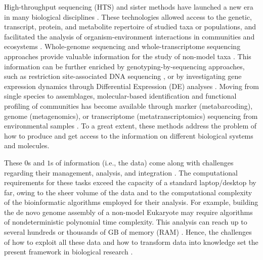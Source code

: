    High-throughput sequencing (HTS) and sister methods have launched a new era in many 
   biological disciplines \citep{mardis2008next, kulski2016next}. 
   These technologies allowed access to the genetic, transcript, protein, and metabolite 
   repertoire \citep{goodwin2016coming} of studied taxa or populations, and facilitated the analysis of 
   organism-environment interactions in communities and ecosystems \citep{bundy2009environmental}. 
   Whole-genome sequencing and whole-transcriptome sequencing approaches provide valuable 
   information for the study of non-model taxa \citep{cahais2012reference}. 
   This information can be further enriched by genotyping-by-sequencing approaches, 
   such as restriction site-associated DNA sequencing \citep{baird2008rapid}, or by investigating gene 
   expression dynamics through Differential Expression (DE) analyses \citep{tarazona2011differential}. 
   Moving from single species to assemblages, molecular-based identification and functional 
   profiling of communities has become available through marker (metabarcoding), 
   genome (metagenomics), or transcriptome (metatranscriptomics) sequencing from environmental 
   samples \citep{goldford2018emergent}. 
   To a great extent, these methods address the problem of how to produce and get access 
   to the information on different biological systems and molecules.

   These $0$s and $1$s of information (i.e., the data) come along with challenges regarding their 
   management, analysis, and integration \citep{merelli2014managing}. 
   The computational requirements for these tasks exceed the capacity of a standard laptop/desktop by far, 
   owing to the sheer volume of the data and to the computational complexity of the bioinformatic algorithms 
   employed for their analysis. 
   For example, building the de novo genome assembly of a non-model Eukaryote may require algorithms 
   of nondeterministic polynomial time complexity. 
   This analysis can reach up to several hundreds or thousands of GB of memory (RAM) \citep{sohn2018present}. 
   Hence, the challenges of how to exploit all these data and how to transform data into knowledge set 
   the present framework in biological research \citep{greene2014big, pal2020big}.
   
